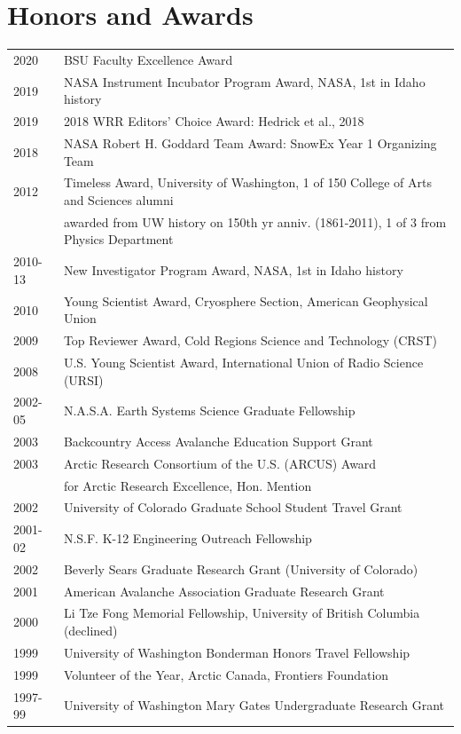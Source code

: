 \documentclass[11pt]{article}
\begin{document}
\section*{Honors and Awards}
\begin{tabular}{ll}
2020 & BSU Faculty Excellence Award \\
2019 & NASA Instrument Incubator Program Award, NASA, 1st in Idaho history \\
2019 & 2018 WRR Editors' Choice Award: Hedrick et al., 2018 \\
2018 & NASA Robert H. Goddard Team Award: SnowEx Year 1 Organizing Team \\
2012 & Timeless Award, University of Washington, 1 of 150 College of Arts and Sciences alumni  \\
& awarded from UW history on 150th yr anniv. (1861-2011), 1 of 3 from Physics Department \\
2010-13 & New Investigator Program Award, NASA, 1st in Idaho history \\
2010 & Young Scientist Award, Cryosphere Section, American Geophysical Union \\
2009 & Top Reviewer Award, Cold Regions Science and Technology (CRST) \\
2008 & U.S. Young Scientist Award, International Union of Radio Science (URSI) \\
2002-05 & N.A.S.A. Earth Systems Science Graduate Fellowship \\
2003 & Backcountry Access Avalanche Education Support Grant \\
2003 & Arctic Research Consortium of the U.S. (ARCUS) Award \\
& for Arctic Research Excellence, Hon. Mention \\
2002 & University of Colorado Graduate School Student Travel Grant \\
2001-02 & N.S.F. K-12 Engineering Outreach Fellowship \\
2002 & Beverly Sears Graduate Research Grant (University of Colorado) \\
2001 & American Avalanche Association Graduate Research Grant \\
2000 & Li Tze Fong Memorial Fellowship, University of British Columbia (declined) \\
1999 & University of Washington Bonderman Honors Travel Fellowship \\
1999 & Volunteer of the Year, Arctic Canada, Frontiers Foundation \\
1997-99 & University of Washington Mary Gates Undergraduate Research Grant \\

\end{tabular}
\end{document}
